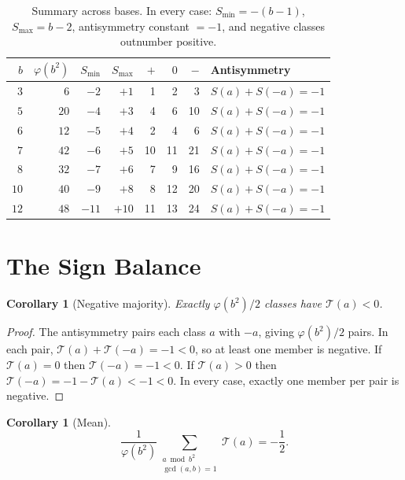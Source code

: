 \documentclass[12pt]{amsart}
\newtheorem{corollary}[theorem]{Corollary}
\theoremstyle{definition}
\theoremstyle{remark}
\begin{document}
\begin{table}[h]
\centering
\begin{tabular}{rrrrrrrl}
\toprule
$b$ & $\varphi(b^2)$ & $S_{\min}$ & $S_{\max}$ &
$+$ & $0$ & $-$ & Antisymmetry \\
\midrule
$3$  &  $6$  & $-2$ & $+1$ &  1 &  2 &  3 & $S(a)+S({-}a)=-1$ \\
$5$  & $20$  & $-4$ & $+3$ &  4 &  6 & 10 & $S(a)+S({-}a)=-1$ \\
$6$  & $12$  & $-5$ & $+4$ &  2 &  4 &  6 & $S(a)+S({-}a)=-1$ \\
$7$  & $42$  & $-6$ & $+5$ & 10 & 11 & 21 & $S(a)+S({-}a)=-1$ \\
$8$  & $32$  & $-7$ & $+6$ &  7 &  9 & 16 & $S(a)+S({-}a)=-1$ \\
$10$ & $40$  & $-9$ & $+8$ &  8 & 12 & 20 & $S(a)+S({-}a)=-1$ \\
$12$ & $48$  &$-11$ &$+10$ & 11 & 13 & 24 & $S(a)+S({-}a)=-1$ \\
\bottomrule
\end{tabular}
\caption{Summary across bases. In every case:
$S_{\min} = -(b{-}1)$, $S_{\max} = b - 2$,
antisymmetry constant $= -1$, and negative classes
outnumber positive.}
\end{table}

\section{The Sign Balance}

\begin{corollary}[Negative majority]\label{cor:negative}
Exactly $\varphi(b^2)/2$ classes have $\mathcal{T}(a) < 0$.
\end{corollary}

\begin{proof}
The antisymmetry pairs each class $a$ with $-a$, giving
$\varphi(b^2)/2$ pairs. In each pair,
$\mathcal{T}(a) + \mathcal{T}(-a) = -1 < 0$, so at least
one member is negative. If $\mathcal{T}(a) = 0$ then
$\mathcal{T}(-a) = -1 < 0$. If $\mathcal{T}(a) > 0$ then
$\mathcal{T}(-a) = -1 - \mathcal{T}(a) < -1 < 0$. In every
case, exactly one member per pair is negative.
\end{proof}

\begin{corollary}[Mean]\label{cor:mean}
\[
\frac{1}{\varphi(b^2)} \sum_{\substack{a \bmod b^2 \\
\gcd(a,b)=1}} \mathcal{T}(a) = -\frac{1}{2}.
\]
\end{corollary}
\end{document}
